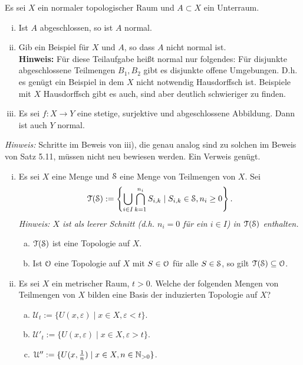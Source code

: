 \begin{aufgabe}Es sei $X$ ein normaler topologischer Raum und $A\subset X$ ein Unterraum.
\begin{enumerate}[i)]
	\item Ist $A$ abgeschlossen, so ist $A$ normal.
	\item Gib ein Beispiel für $X$ und $A$, so dass $A$ nicht normal ist.\\
	\textbf{Hinweis:} Für diese Teilaufgabe heißt normal nur folgendes: Für disjunkte abgeschlossene Teilmengen $B_1,B_2$ gibt es disjunkte offene Umgebungen. D.h. es genügt ein Beispiel in dem $X$ nicht notwendig Hausdorffsch ist. Beispiele mit $X$ Hausdorffsch gibt es auch, sind aber deutlich schwieriger zu finden.
	\item Es sei $f\colon X\to Y$ eine stetige, surjektive und abgeschlossene Abbildung. Dann ist auch $Y$ normal.
\end{enumerate}
\emph{Hinweis:} Schritte im Beweis von iii), die genau analog sind zu solchen im Beweis von Satz 5.11, müssen nicht neu bewiesen werden. Ein Verweis genügt.
\end{aufgabe}
\begin{aufgabe}
	\begin{enumerate}[i)]
		\item Es sei $X$ eine Menge und $\mathcal S$ eine Menge von Teilmengen von
		$X$. Sei
		\[ \mathcal T(\mathcal S) := \left\{ \bigcup_{i\in I} \bigcap_{k=1}^{n_i} S_{i,k}\mid S_{i,k}\in \mathcal S, n_i\geq 0 \right\}. \]
		\emph{Hinweis: $X$ ist als leerer Schnitt (d.h. $n_i=0$ für ein $i\in I$) in $\mathcal T(\mathcal S)$ enthalten.}
		\begin{enumerate}[a)]
			\item ${\mathcal T}(\mathcal S)$ ist eine Topologie auf $X$.
			\item Ist $\mathcal O$ eine Topologie auf $X$ mit $S\in \mathcal O$ für alle $S\in\mathcal S$, so gilt $\mathcal T(\mathcal S)\subseteq\mathcal O$.
		\end{enumerate}
		\item Es sei $X$ ein metrischer Raum, $t>0$. Welche der folgenden Mengen von Teilmengen von $X$ bilden eine Basis der induzierten Topologie auf $X$?
		\begin{enumerate}[a)]
			\item $\mathcal U_t :=\{ U(x, \varepsilon)\mid x\in X, \varepsilon < t\} $.
			\item $\mathcal U'_t :=\{ U(x, \varepsilon)\mid x\in X, \varepsilon > t\} $.
			\item $\mathcal U'' :=\{ U(x,\tfrac{1}{n})\mid x\in X, n\in\mathbb{N}_{>0}\} $.
		\end{enumerate}
	\end{enumerate}
\end{aufgabe}
